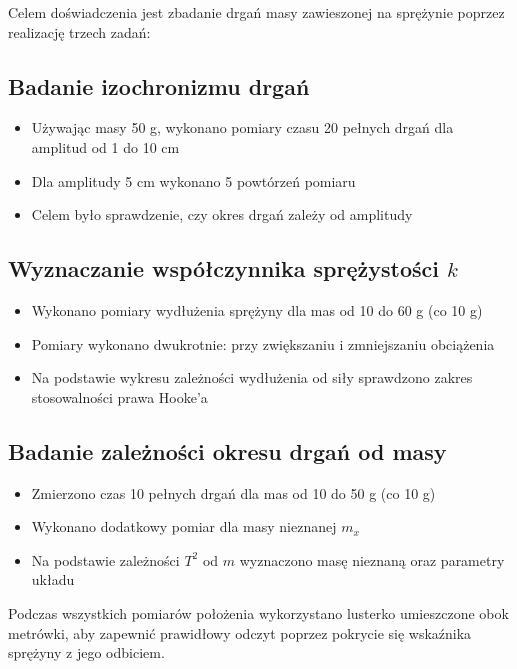 \documentclass[a4paper,12pt]{article}
\begin{document}
Celem doświadczenia jest zbadanie drgań masy zawieszonej na sprężynie poprzez realizację trzech zadań:

\subsection*{Badanie izochronizmu drgań}
\begin{itemize}
    \setlength{\itemsep}{0em}
    \item Używając masy 50 g, wykonano pomiary czasu 20 pełnych drgań dla amplitud od 1 do 10 cm
    \item Dla amplitudy 5 cm wykonano 5 powtórzeń pomiaru
    \item Celem było sprawdzenie, czy okres drgań zależy od amplitudy
\end{itemize}

\subsection*{Wyznaczanie współczynnika sprężystości $k$}
\begin{itemize}
    \setlength{\itemsep}{0em}
    \item Wykonano pomiary wydłużenia sprężyny dla mas od 10 do 60 g (co 10 g)
    \item Pomiary wykonano dwukrotnie: przy zwiększaniu i zmniejszaniu obciążenia
    \item Na podstawie wykresu zależności wydłużenia od siły sprawdzono zakres stosowalności prawa Hooke'a
\end{itemize}

\subsection*{Badanie zależności okresu drgań od masy}
\begin{itemize}
    \setlength{\itemsep}{0em}
    \item Zmierzono czas 10 pełnych drgań dla mas od 10 do 50 g (co 10 g)
    \item Wykonano dodatkowy pomiar dla masy nieznanej $m_x$
    \item Na podstawie zależności $T^2$ od $m$ wyznaczono masę nieznaną oraz parametry układu
\end{itemize}

Podczas wszystkich pomiarów położenia wykorzystano lusterko umieszczone obok metrówki, aby zapewnić prawidłowy odczyt poprzez pokrycie się wskaźnika sprężyny z jego odbiciem.
\end{document}
